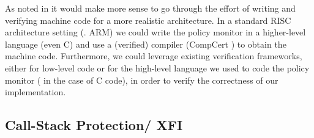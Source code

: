 As noted in \cite{pump_popl2015} it would make more sense to go
through the effort of writing and verifying machine code for a more
realistic architecture.  In a standard RISC architecture setting
(\EG. ARM) we could write the policy monitor in a higher-level
language (even C) and use a (verified) compiler (\EG CompCert
\cite{leroy09:compcert}) to obtain the machine code. Furthermore, we
could leverage existing verification frameworks, either for low-level
code \cite{Chlipala2013,JensenBK13} or for the high-level language we
used to code the policy monitor (\EG
\cite{Appel:2011:VST:1987211.1987212} in the case of C code), in order
to verify the correctness of our implementation.



\subsection{Call-Stack Protection/ XFI}
